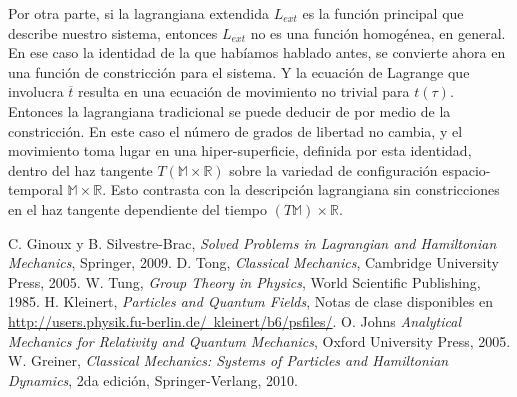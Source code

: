 \documentclass[a4paper,10pt]{article}
\numberwithin{equation}{section}
\begin{document}
\vspace{.3cm}

Por otra parte, si la lagrangiana extendida $L_{ext}$ es la función principal que 
describe nuestro sistema, entonces $L_{ext}$ no es una función homogénea, en general. 
En ese caso la identidad de la que habíamos hablado antes, se convierte ahora en una 
función de constricción para el sistema. Y la ecuación de Lagrange que involucra 
$\overline{t}$ resulta en una ecuación de movimiento no trivial para $t(\tau)$. Entonces 
la lagrangiana tradicional se puede deducir de  por medio 
de la constricción. En este caso el número de grados de libertad no cambia, y el movimiento 
toma lugar en una hiper-superficie, definida por esta identidad, dentro del haz 
tangente $T(\mathbb{M}\times\mathbb{R})$ sobre la variedad de configuración espacio-temporal 
$\mathbb{M}\times\mathbb{R}$. Esto contrasta con la descripción lagrangiana sin 
constricciones en el haz tangente dependiente del tiempo $(T\mathbb{M})\times \mathbb{R}$.


\begin{thebibliography}{20}
C. Ginoux y B. Silvestre-Brac, \emph{Solved Problems in Lagrangian and Hamiltonian Mechanics},
Springer, 2009.
D. Tong, \emph{Classical Mechanics}, Cambridge University Press, 2005.
W. Tung, \emph{Group Theory in Physics}, World Scientific Publishing, 1985.
H. Kleinert, \emph{Particles and Quantum Fields}, Notas de clase 
disponibles en \href{http://users.physik.fu-berlin.de/~kleinert/b6/psfiles/}{http://users.physik.fu-berlin.de/~kleinert/b6/psfiles/}.
O. Johns \emph{Analytical Mechanics for Relativity and Quantum Mechanics}, Oxford 
University Press, 2005.
W. Greiner, \emph{Classical Mechanics: Systems of Particles and Hamiltonian Dynamics},
2da edición, Springer-Verlang, 2010.
\end{thebibliography}
\end{document}
